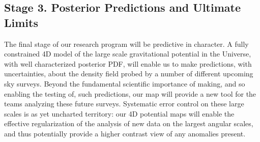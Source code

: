\documentclass[psfig,12pt]{article}
\def\ni{\noindent}
\def\lo{\mathrel{\raise.3ex\hbox{$<$}\mkern-14mu\lower0.6ex\hbox{$\sim$}}}
\begin{document}
{%
%
%
%


\subsection{Stage 3. Posterior Predictions and Ultimate Limits}
\label{sec:research:stagethree}

The final stage of our research program will be predictive in
character. A fully constrained 4D model of the large scale gravitational
potential in the Universe, with well characterized posterior PDF, will
enable us to make predictions, with uncertainties, about the  density
field probed by a number of different upcoming sky surveys. Beyond the
fundamental scientific importance of making, and so enabling the testing
of, such predictions, our map will provide a new tool for the
teams analyzing these future surveys. Systematic error control on these
large scales is as yet uncharted territory: our 4D potential maps will
enable the effective regularization of the analysis of
new data on the largest angular scales, and thus potentially provide a
higher contrast view of any anomalies present.

}
\end{document}
